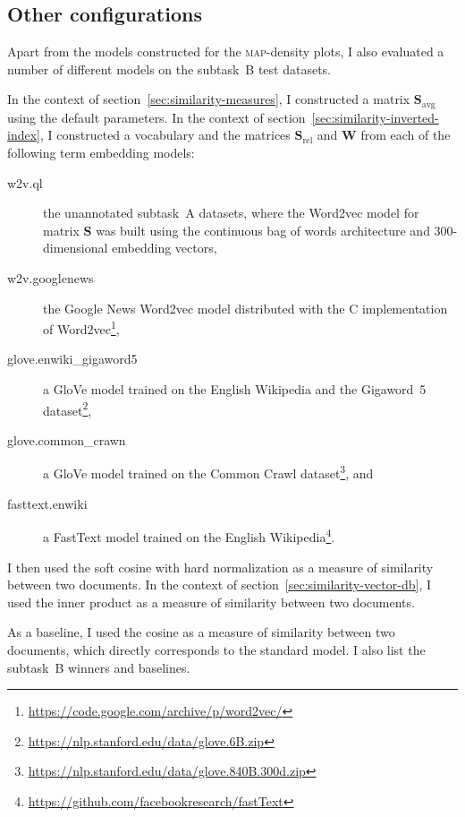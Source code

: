 \documentclass[
  digital, %
  notable, %
  lof,     %
  lot,     %
  nopalatino, color
]{fithesis3}
\newcommand{\op}[1]{\ensuremath{\operatorname{#1}}}
\newcommand{\avg}{\op{avg}}
\def\abbr#1{\textsc{\MakeLowercase{#1}}}
\let\note=\footnote
\begin{document}
\subsection{Other configurations}
Apart from the models constructed for the
\abbr{MAP}\index{map@\abbr {MAP}}-density plots, I also evaluated a number of
different models on the subtask~B test datasets.

In the context of section~\ref{sec:similarity-measures}, I constructed a matrix
$\mathbf S_{\avg}$\index{.savg@$\mathbf S_{\avg}$} using the default
parameters.
In the context of section~\ref{sec:similarity-inverted-index}, I constructed a
vocabulary and the matrices $\mathbf S_{\textrm{rel}}$
 and $\mathbf W$ from each of the
following term embedding models:
\begin{description}
  \item[w2v.ql] the unannotated subtask~A datasets, where the
    Word2vec model for matrix $\mathbf S$
    was built using the continuous bag of words architecture and
    300-dimensional embedding vectors,
  \item[w2v.googlenews] the Google News Word2vec model
    distributed with the C implementation of
    Word2vec\note{\url{https://code.google.com/archive/p/word2vec/}},
  \item[glove.enwiki\_gigaword5] a GloVe
    model trained on the
    English Wikipedia and the Gigaword~5
    dataset\note{\url{https://nlp.stanford.edu/data/glove.6B.zip}},
  \item[glove.common\_crawn] a GloVe model trained on the
    Common Crawl
    dataset\note{\url{https://nlp.stanford.edu/data/glove.840B.300d.zip}}, and
  \item[fasttext.enwiki] a FastText
    model trained on the English
    Wikipedia\note{\url{https://github.com/facebookresearch/fastText}}.
\end{description}
I then used the soft cosine with hard
normalization as a measure of similarity between two
documents.
In the context of section~\ref{sec:similarity-vector-db}, I used the inner
product as a measure of similarity between two documents.

As a baseline, I used the cosine as a measure of
similarity between two documents, which directly corresponds to the standard
model. I also list the subtask~B winners and
baselines.
\end{document}
